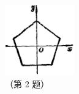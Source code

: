 \begin{enhancedline}
\begin{lianxi}
\begin{minipage}{10cm}

\end{minipage}
\quad
\begin{minipage}{4cm}
    \centering
    \includegraphics[width=3cm]{../pic/ltjh-ch1-subsec3-lx-02.png}\\
    （第 2 题）
\end{minipage}

\end{lianxi}
\end{enhancedline}
